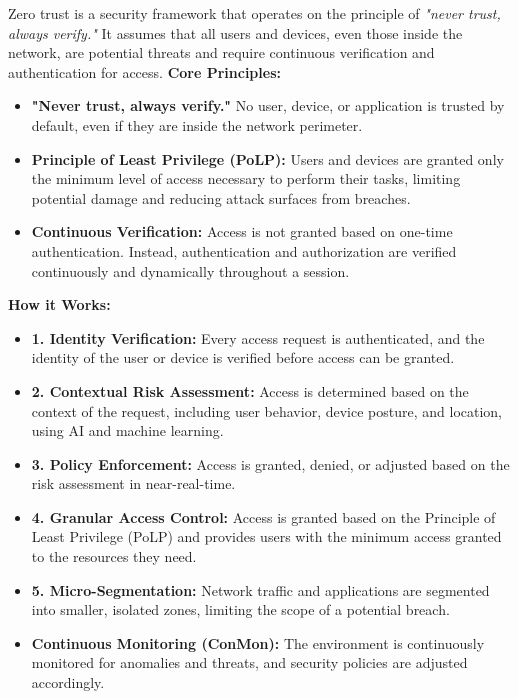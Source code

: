  Zero trust is a security framework that operates on the principle of \textit{"never trust, always verify."} It assumes that all users and devices, even those inside the network, are potential threats and require continuous verification and authentication for access.
\textbf{Core Principles:}
\begin{itemize}
    \item \textbf{"Never trust, always verify."} No user, device, or application is trusted by default, even if they are inside the network perimeter.
    \item \textbf{Principle of Least Privilege (PoLP):} Users and devices are granted only the minimum level of access necessary to perform their tasks, limiting potential damage and reducing attack surfaces from breaches.
    \item \textbf{Continuous Verification:} Access is not granted based on one-time authentication. Instead, authentication and authorization are verified continuously and dynamically throughout a session.
\end{itemize}
\textbf{How it Works:}
\begin{itemize}
    \item \textbf{1. Identity Verification:} Every access request is authenticated, and the identity of the user or device is verified before access can be granted.
    \item \textbf{2. Contextual Risk Assessment:} Access is determined based on the context of the request, including user behavior, device posture, and location, using AI and machine learning.
    \item \textbf{3. Policy Enforcement:} Access is granted, denied, or adjusted based on the risk assessment in near-real-time.
    \item \textbf{4. Granular Access Control:} Access is granted based on the Principle of Least Privilege (PoLP) and provides users with the minimum access granted to the resources they need.
    \item \textbf{5. Micro-Segmentation:} Network traffic and applications are segmented into smaller, isolated zones, limiting the scope of a potential breach.
    \item \textbf{Continuous Monitoring (ConMon):} The environment is continuously monitored for anomalies and threats, and security policies are adjusted accordingly.
\end{itemize}

